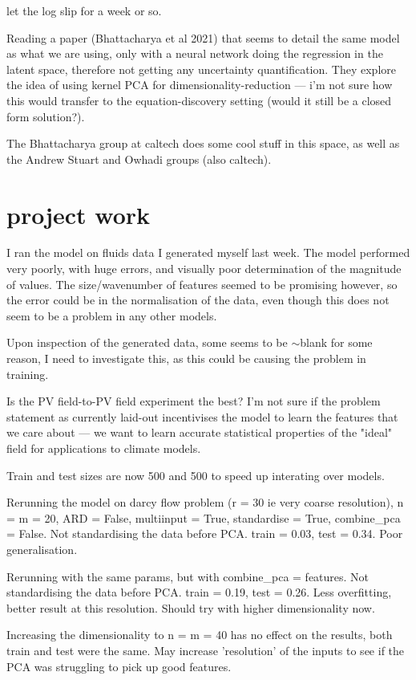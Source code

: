 \documentclass[11pt,a4paper]{article}
\begin{document}
let the log slip for a week or so.

Reading a paper (Bhattacharya et al 2021) that seems to detail the same model as what we are using, only with a neural network doing the regression in the latent space, therefore not getting any uncertainty quantification.
They explore the idea of using kernel PCA for dimensionality-reduction --- i'm not sure how this would transfer to the equation-discovery setting (would it still be a closed form solution?).

The Bhattacharya group at caltech does some cool stuff in this space, as well as the Andrew Stuart and Owhadi groups (also caltech). 

\section{project work}
I ran the model on fluids data I generated myself last week.
The model performed very poorly, with huge errors, and visually poor determination of the magnitude of values. 
The size/wavenumber of features seemed to be promising however, so the error could be in the normalisation of the data, even though this does not seem to be a problem in any other models.

Upon inspection of the generated data, some seems to be $\sim$blank for some reason, I need to investigate this, as this could be causing the problem in training.

Is the PV field-to-PV field experiment the best?
I'm not sure if the problem statement as currently laid-out incentivises the model to learn the features that we care about --- we want to learn accurate statistical properties of the "ideal" field for applications to climate models.

Train and test sizes are now 500 and 500 to speed up interating over models.

Rerunning the model on darcy flow problem (r = 30 ie very coarse resolution), n = m = 20, ARD = False, multiinput = True, standardise = True, combine\_pca = False.
Not standardising the data before PCA.
train = 0.03, test = 0.34.
Poor generalisation.

Rerunning with the same params, but with combine\_pca = features.
Not standardising the data before PCA.
train = 0.19, test = 0.26.
Less overfitting, better result at this resolution.
Should try with higher dimensionality now.

Increasing the dimensionality to n = m = 40 has no effect on the results, both train and test were the same.
May increase 'resolution' of the inputs to see if the PCA was struggling to pick up good features.
\end{document}
